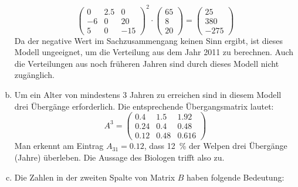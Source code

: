 \begin{exercise}
\begin{enumerate}[a)]
\begin{equation*}
              \begin{pmatrix}
                \num{0}  & \num{2.5} & \num{0}   \\
                -\num{6} & \num{0}   & \num{20}  \\
                \num{5}  & \num{0}   & -\num{15}
              \end{pmatrix}^2
              \cdot
              \begin{pmatrix}
                \num{65} \\
                \num{8}  \\
                \num{20}
              \end{pmatrix}
              =
              \begin{pmatrix}
                \num{25}  \\
                \num{380} \\
                -\num{275}
              \end{pmatrix}
            \end{equation*}
            Da der negative Wert im Sachzusammengang
            keinen Sinn ergibt, ist dieses Modell
            ungeeignet, um die Verteilung aus dem
            Jahr 2011 zu berechnen. Auch die
            Verteilungen aus noch früheren Jahren
            sind durch dieses Modell nicht
            zugänglich.
      \item Um ein Alter von mindestens 3 Jahren
            zu erreichen sind in diesem Modell
            drei Übergänge erforderlich.
            Die entsprechende Übergangsmatrix
            lautet:
            \begin{equation*}
              A^3=
              \begin{pmatrix}
                \num{0.4}  & \num{1.5}  & \num{1.92}  \\
                \num{0.24} & \num{0.4}  & \num{0.48}  \\
                \num{0.12} & \num{0.48} & \num{0.616}
              \end{pmatrix}
            \end{equation*}
            Man erkennt am Eintrag $A_{31}=\num{0.12}$,
            dass \SI{12}{\percent} der Welpen drei
            Übergänge (Jahre) überleben.
            Die Aussage des Biologen trifft also zu.
      \item Die Zahlen in der zweiten Spalte von
            Matrix $B$ haben folgende Bedeutung:
            \begin{itemize}
              \renewcommand{\itemsep}{-1ex}%

\end{itemize}
\end{enumerate}
\end{exercise}
